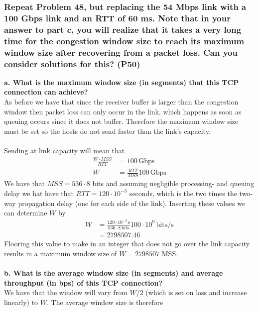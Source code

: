 \subsubsection{Repeat Problem 48, but replacing the 54 Mbps link with a 100 Gbps link and an RTT of 60 ms. Note that in your answer to part c, you will realize that it takes a very long time for the congestion window size to reach its maximum window size after recovering from a packet loss. Can you consider solutions for this? (P50)}

\textbf{a. What is the maximum window size (in segments) that this TCP connection can achieve?} \\
As before we have that since the receiver buffer is larger than the congestion window then packet loss can only occur in the link, which happens as soon as queuing occurs since it does not buffer. Therefore the maximum window size must be set so the hosts do not send faster than the link's capacity. \\
\\
Sending at link capacity will mean that 
\begin{equation*}
\begin{split}
    \frac{W \cdot MSS}{RTT} &= 100 \, \text{Gbps} \\
    W &= \frac{RTT}{MSS} 100 \, \text{Gbps}
\end{split}
\end{equation*}
We have that $MSS = 536 \cdot 8$ bits and assuming negligible processing- and queuing delay we hat have that $RTT = 120 \cdot 10^{-3}$ seconds, which is the two times the two-way propagation delay (one for each side of the link). Inserting these values we can determine $W$ by
\begin{equation*}
\begin{split}
    W &= \frac{120 \cdot 10^{-3} \, \text{s}}{536 \cdot 8 \, \text{bits}} 100 \cdot 10^9 \, \text{bits/s} \\
    &= 2798507.46
\end{split}
\end{equation*}
Flooring this value to make in an integer that does not go over the link capacity results in a maximum window size of $W = 2798507$ MSS. \\
\\
\textbf{b. What is the average window size (in segments) and average throughput (in bps) of this TCP connection?} \\
We have that the window will vary from $W/2$ (which is set on loss and increase linearly) to $W$. The average window size is therefore 

